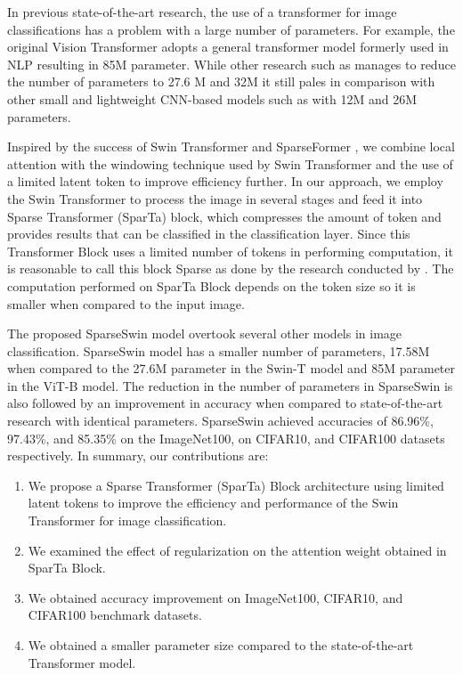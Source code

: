\documentclass[runningheads]{llncs}
\begin{document}
In previous state-of-the-art research, the use of a transformer for image classifications has a problem with a large number of parameters. For example, the original Vision Transformer adopts a general transformer model formerly used in NLP resulting in 85M parameter. While other research such as \cite{liu2021swin} \cite{gao2023sparseformer} manages to reduce the number of parameters to 27.6 M and 32M it still pales in comparison with other small and lightweight CNN-based models such as \cite{DBLP:journals/corr/abs-1905-11946, DBLP:journals/corr/HeZRS15} with 12M and 26M parameters.

Inspired by the success of Swin Transformer \cite{liu2021swin} and SparseFormer \cite{gao2023sparseformer}, we combine local attention with the windowing technique used by Swin Transformer and the use of a limited latent token to improve efficiency further. In our approach, we employ the Swin Transformer to process the image in several stages and feed it into Sparse Transformer (SparTa) block, which compresses the amount of token and provides results that can be classified in the classification layer. Since this Transformer Block uses a limited number of tokens in performing computation, it is reasonable to call this block Sparse as done by the research conducted by \cite{gao2023sparseformer}. The computation performed on SparTa Block depends on the token size so it is smaller when compared to the input image.

The proposed SparseSwin model overtook several other models in image classification. SparseSwin model has a smaller number of parameters, 17.58M when compared to the 27.6M parameter in the Swin-T model and 85M parameter in the ViT-B model. The reduction in the number of parameters in SparseSwin is also followed by an improvement in accuracy when compared to state-of-the-art research with identical parameters. SparseSwin achieved accuracies of 86.96\%, 97.43\%, and 85.35\% on the ImageNet100, on CIFAR10, and CIFAR100 datasets respectively. In summary, our contributions are:
\begin{enumerate}
  \item We propose a Sparse Transformer (SparTa) Block architecture using limited latent tokens to improve the efficiency and performance of the Swin Transformer for image classification.
  \item We examined the effect of regularization on the attention weight obtained in SparTa Block.
  \item We obtained accuracy improvement on ImageNet100, CIFAR10, and CIFAR100 benchmark datasets.
  \item We obtained a smaller parameter size compared to the state-of-the-art Transformer model.
\end{enumerate}
\end{document}

